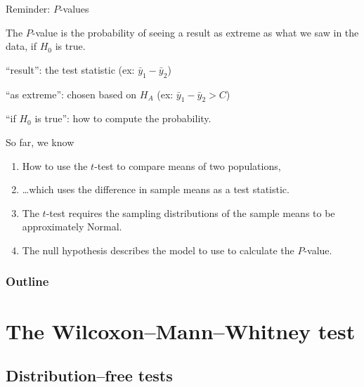 \begin{frame}{Reminder: $P$-values}

    \begin{block}{}
      The \alert<1>{$P$-value} is the probability of seeing a \alert<2>{result} \alert<3>{as extreme} as what we saw in the data, \alert<4>{if $H_0$ is true}.
    \end{block}

    \vspace{2em}
          \pause

    \begin{itemizew}{4em}
        \item[``result'':] the test statistic (ex: $\bar y_1 - \bar y_2$)
          \pause
        \item[``as extreme'':] chosen based on $H_A$ (ex: $\bar y_1 - \bar y_2 > C$)
          \pause
        \item[``if $H_0$ is true'':] how to compute the probability.
    \end{itemizew}

\end{frame}

\begin{frame}{So far, we know}
  \begin{enumerate}
    \item How to use the $t$-test to compare means of two populations,
    \item \ldots which uses the difference in sample means as a test statistic.
    \item The $t$-test requires the sampling distributions of the sample means to be approximately Normal.
    \item The null hypothesis describes the model to use to calculate the $P$-value.
  \end{enumerate}
\end{frame}


\begin{frame}\frametitle<presentation>{Outline}
  \tableofcontents
\end{frame}



\section{The Wilcoxon--Mann--Whitney test}

\subsection{Distribution--free tests}

